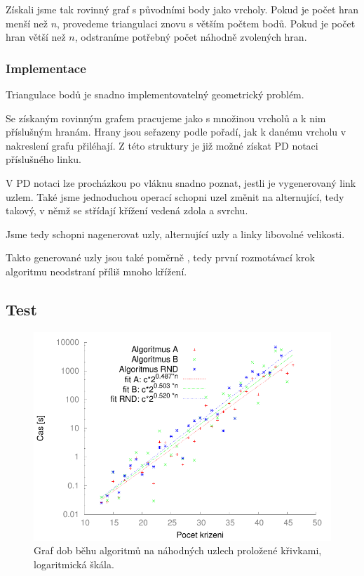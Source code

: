 Získali jsme tak rovinný graf s původními body jako vrcholy. Pokud je počet hran menší než $n$, provedeme triangulaci znovu s větším počtem bodů. Pokud je počet hran větší než $n$, odstraníme potřebný počet náhodně zvolených hran.


\subsubsection{Implementace}

Triangulace bodů je snadno implementovatelný geometrický problém. 

Se získaným rovinným grafem pracujeme jako s množinou vrcholů a k nim příslušným hranám. Hrany jsou seřazeny podle pořadí, jak k danému vrcholu v nakreslení grafu přiléhají. Z této struktury je již možné získat PD notaci příslušného linku.


V PD notaci lze procházkou po vláknu snadno poznat, jestli je vygenerovaný link uzlem. Také jsme jednoduchou operací schopni uzel změnit na alternující, tedy takový, v němž se střídají křížení vedená zdola a svrchu.

Jsme tedy schopni nagenerovat uzly, alternující uzly a linky libovolné velikosti.

Takto generované uzly jsou také poměrně , tedy první rozmotávací krok algoritmu neodstraní příliš mnoho křížení.

\subsection{Test}

\begin{figure}[p]\centering
\includegraphics{../img/knotsFIT}
\caption{Graf dob běhu algoritmů na náhodných uzlech proložené křivkami, logaritmická škála.}
\label{obr03:knotSrov}
\end{figure}

